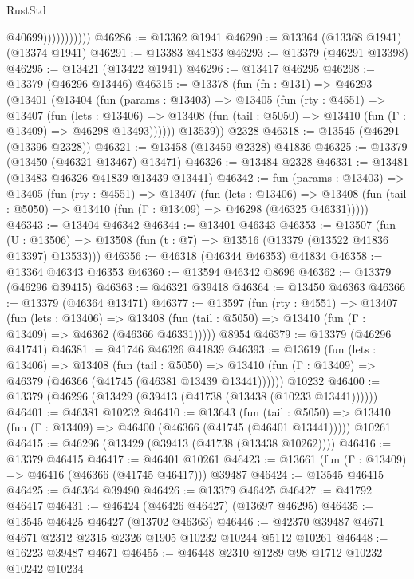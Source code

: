 \begin{lexlean}{RustStd}
\begin{coremodule}
                          @40699)))))))))))
@46286 := @13362 @1941
@46290 := @13364 (@13368 @1941) (@13374 @1941)
@46291 := @13383 @41833
@46293 := @13379 (@46291 @13398)
@46295 := @13421 (@13422 @1941)
@46296 := @13417 @46295
@46298 := @13379 (@46296 @13446)
@46315 := @13378
    (fun (fn : @131) =>
    @46293
      (@13401
        (@13404
          (fun (params : @13403) =>
          @13405
            (fun (rty : @4551) =>
            @13407
              (fun (lets : @13406) =>
              @13408 (fun (tail : @5050) => @13410 (fun (Γ : @13409) => @46298 @13493))))))
        @13539))
    @2328
@46318 := @13545 (@46291 (@13396 @2328))
@46321 := @13458 (@13459 @2328) @41836
@46325 := @13379 (@13450 (@46321 @13467) @13471)
@46326 := @13484 @2328
@46331 := @13481 (@13483 @46326 @41839 @13439 @13441)
@46342 := fun (params : @13403) =>
  @13405
    (fun (rty : @4551) =>
    @13407
      (fun (lets : @13406) =>
      @13408 (fun (tail : @5050) => @13410 (fun (Γ : @13409) => @46298 (@46325 @46331)))))
@46343 := @13404 @46342
@46344 := @13401 @46343
@46353 := @13507
    (fun (U : @13506) => @13508 (fun (t : @7) => @13516 (@13379 (@13522 @41836 @13397) @13533)))
@46356 := @46318 (@46344 @46353) @41834
@46358 := @13364 @46343 @46353
@46360 := @13594 @46342 @8696
@46362 := @13379 (@46296 @39415)
@46363 := @46321 @39418
@46364 := @13450 @46363
@46366 := @13379 (@46364 @13471)
@46377 := @13597
    (fun (rty : @4551) =>
    @13407
      (fun (lets : @13406) =>
      @13408 (fun (tail : @5050) => @13410 (fun (Γ : @13409) => @46362 (@46366 @46331)))))
    @8954
@46379 := @13379 (@46296 @41741)
@46381 := @41746 @46326 @41839
@46393 := @13619
    (fun (lets : @13406) =>
    @13408
      (fun (tail : @5050) =>
      @13410 (fun (Γ : @13409) => @46379 (@46366 (@41745 (@46381 @13439 @13441))))))
    @10232
@46400 := @13379 (@46296 (@13429 (@39413 (@41738 (@13438 (@10233 @13441))))))
@46401 := @46381 @10232
@46410 := @13643
    (fun (tail : @5050) => @13410 (fun (Γ : @13409) => @46400 (@46366 (@41745 (@46401 @13441)))))
    @10261
@46415 := @46296 (@13429 (@39413 (@41738 (@13438 @10262))))
@46416 := @13379 @46415
@46417 := @46401 @10261
@46423 := @13661 (fun (Γ : @13409) => @46416 (@46366 (@41745 @46417))) @39487
@46424 := @13545 @46415
@46425 := @46364 @39490
@46426 := @13379 @46425
@46427 := @41792 @46417
@46431 := @46424 (@46426 @46427) (@13697 @46295)
@46435 := @13545 @46425 @46427 (@13702 @46363)
@46446 := @42370 @39487 @4671 @4671 @2312 @2315 @2326 @1905 @10232 @10244 @5112 @10261
@46448 := @16223 @39487 @4671
@46455 := @46448 @2310 @1289 @98 @1712 @10232 @10242 @10234

\end{coremodule}
\end{lexlean}
